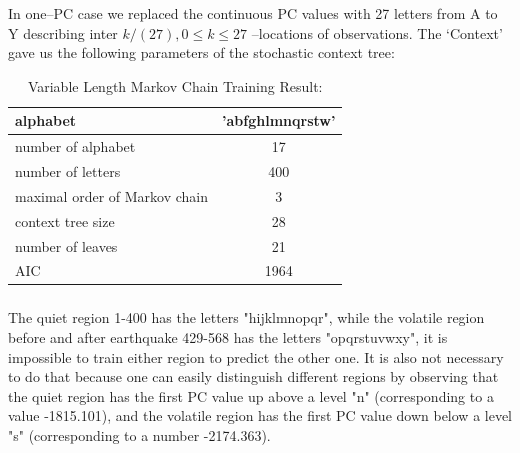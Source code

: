 \documentclass{beamer}
\begin{document}
\begin{frame}
\frametitle{}
In one--PC case we replaced the continuous PC values with 27 letters from A to Y describing inter $k/(27), 0\le k\le 27$ --locations of 
observations.
The `Context' gave us the following parameters of the stochastic context tree:
\\
\begin{table}[H]
\caption {Variable Length Markov Chain Training Result: }
\centering
\begin{tabular}{ l | c }
    \hline

    alphabet  & 'abfghlmnqrstw' \\ \hline
    number of alphabet &  17 \\ \hline
    number of letters &  400 \\ \hline
    maximal order of Markov chain & 3 \\ \hline
    context tree size & 28 \\ \hline
    number of leaves & 21\\ \hline
    AIC & 1964 \\ \hline
  \end{tabular}
\end{table}




\end{frame}
\begin{frame}
\frametitle{}
The quiet region 1-400 has the letters "hijklmnopqr", while the volatile region before  and after earthquake 429-568 has the letters "opqrstuvwxy", 
it is impossible to train either region to predict the other one. It is also not necessary to do that because one can easily distinguish different regions 
by observing that the quiet region has the first PC value up above a level "n" (corresponding to a value -1815.101), and the volatile region has the first PC value down below a level "s" (corresponding to a number -2174.363).




\end{frame}
\end{document}
